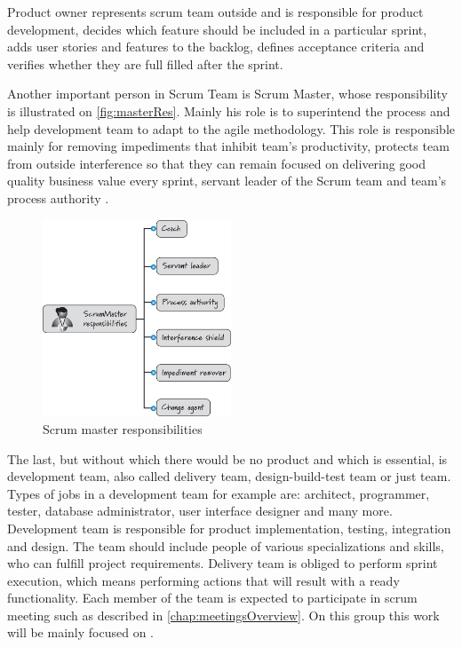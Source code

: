 Product owner represents scrum team outside and is responsible for product development, decides which feature should be included in a particular sprint, adds user stories and features to the backlog, defines acceptance criteria and verifies whether they are full filled after the sprint. 

Another important person in Scrum Team is Scrum Master, whose responsibility is illustrated on \autoref{fig:masterRes}. Mainly his role is to superintend the process and help development team to adapt to the agile methodology. This role is responsible mainly for removing impediments that inhibit team's productivity, protects team from outside interference so that they can remain focused on delivering good quality business value every sprint, servant leader of the Scrum team and team's process authority \cite{ScrumBook}.

\begin{figure}[h]
\caption{Scrum master responsibilities \cite{ScrumBook}}
\label{fig:masterRes}
\centering
\includegraphics[width=0.5\textwidth]{img/masterRes}
\end{figure}

The last, but without which there would be no product and which is essential, is development team, also called delivery team, design-build-test team or just team. Types of jobs in a development team for example are: architect, programmer, tester, database administrator, user interface designer and many more. Development team is responsible for product implementation, testing, integration and design. The team should include people of various specializations and skills, who can fulfill project requirements. Delivery team is obliged to perform sprint execution, which means performing actions that will result with a ready functionality. Each member of the team is expected to participate in scrum meeting such as described in \autoref{chap:meetingsOverview}. On this group this work will be mainly focused on \cite{ScrumBook}.

